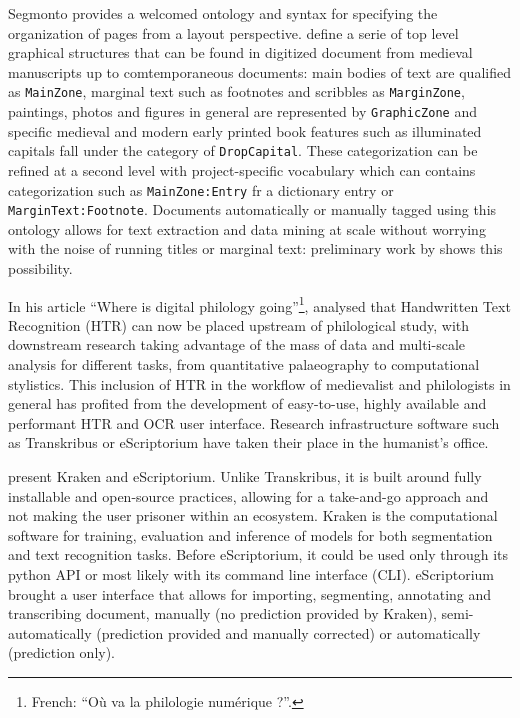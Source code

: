 \documentclass{jdmdh}
\begin{document}
Segmonto provides a welcomed ontology and syntax for specifying the organization of pages from a layout perspective. \citet{gabay2021segmonto} define a serie of top level graphical structures that can be found in digitized document from medieval manuscripts up to comtemporaneous documents: main bodies of text are qualified as \texttt{MainZone}, marginal text such as footnotes and scribbles as \texttt{MarginZone}, paintings, photos and figures in general are represented by \texttt{GraphicZone} and specific medieval and modern early printed book features such as illuminated capitals fall under the category of \texttt{DropCapital}. These categorization can be refined at a second level with project-specific vocabulary which can contains categorization such as \texttt{MainZone:Entry} fr a dictionary entry or \texttt{MarginText:Footnote}. Documents automatically or manually tagged using this ontology allows for text extraction and data mining at scale without worrying with the noise of running titles or marginal text: preliminary work by \citet{christensen2022gallic} shows this possibility.

In his article ``Where is digital philology going''\footnote{French: ``Où va la philologie numérique ?''.}, \citet{camps2018o} analysed that Handwritten Text Recognition (HTR) can now be placed upstream of philological study, with downstream research taking advantage of the mass of data and multi-scale analysis for different tasks, from quantitative palaeography to computational stylistics. This inclusion of HTR in the workflow of medievalist and philologists in general has profited from the development of easy-to-use, highly available and performant HTR and OCR user interface. Research infrastructure software such as Transkribus \citep{kahle2017transkribus} or eScriptorium have taken their place in the humanist's office.

\citet{kiessling2019escriptorium} present Kraken and eScriptorium. Unlike Transkribus, it is built around fully installable and open-source practices, allowing for a take-and-go approach and not making the user prisoner within an ecosystem. Kraken is the computational software for training, evaluation and inference of models for both segmentation and text recognition tasks. Before eScriptorium, it could be used only through its python API or most likely with its command line interface (CLI). eScriptorium brought a user interface that allows for importing, segmenting, annotating and transcribing document, manually (no prediction provided by Kraken), semi-automatically (prediction provided and manually corrected) or automatically (prediction only).
\end{document}
